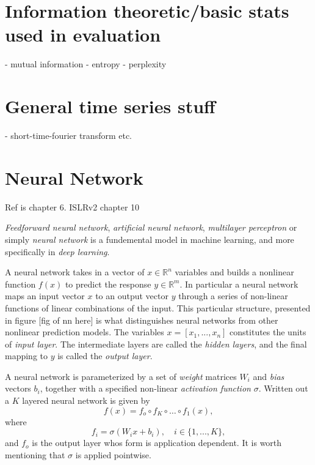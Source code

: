 \documentclass[../../thesis.tex]{subfiles}
\begin{document}


\section{Information theoretic/basic stats used in evaluation}

- mutual information
- entropy
- perplexity

\section{General time series stuff}
- short-time-fourier transform etc.

\section{Neural Network}

Ref is \cite{deeplearningbook} chapter 6. ISLRv2 chapter 10

\textit{Feedforward neural network}, \textit{artificial neural network}, \textit{multilayer perceptron} or simply \textit{neural network} is a fundemental model in machine learning, and more specifically in \textit{deep learning}. 

A neural network takes in a vector of $x \in \mathbb{R}^n$ variables and builds a nonlinear function $f(x)$ to predict the response $y\in \mathbb{R}^m$. In particular a neural network maps an input vector $x$ to an output vector $y$ through a series of non-linear functions of linear combinations of the input. This particular structure, presented in figure [fig of nn here] is what distinguishes neural networks from other nonlinear prediction models. The variables $x = [x_1,...,x_n]$ constitutes the units of \textit{input layer}. The intermediate layers are called the \textit{hidden layers}, and the final mapping to $y$ is called the \textit{output layer}.

A neural network is parameterized by a set of \textit{weight} matrices $W_i$ and \textit{bias} vectors $b_i$, together with a specified non-linear \textit{activation function} $\sigma$. Written out a $K$ layered neural network is given by 
\[ 
f(x) = f_o \circ f_K \circ \ldots \circ f_1(x),
\]
where 
$$f_i = \sigma(W_ix+b_i), \quad i \in \{1,...,K\},$$ 
and $f_o$ is the output layer whos form is application dependent. It is worth mentioning that $\sigma$ is applied pointwise.
\end{document}

